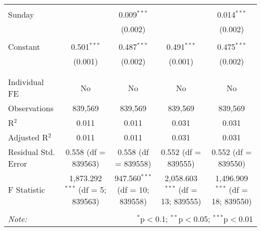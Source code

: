 \documentclass[
]{article}
\begin{document}
\begin{table}[!htbp]
{\begin{tabular}{@{\extracolsep{5pt}}lcccc}
  & & & & \\ 
 Sunday &  & 0.009$^{***}$ &  & 0.014$^{***}$ \\ 
  &  & (0.002) &  & (0.002) \\ 
  & & & & \\ 
 Constant & 0.501$^{***}$ & 0.487$^{***}$ & 0.491$^{***}$ & 0.475$^{***}$ \\ 
  & (0.001) & (0.002) & (0.001) & (0.002) \\ 
  & & & & \\ 
\hline \\[-1.8ex] 
Individual FE & No & No & No & No \\ 
Observations & 839,569 & 839,569 & 839,569 & 839,569 \\ 
R$^{2}$ & 0.011 & 0.011 & 0.031 & 0.031 \\ 
Adjusted R$^{2}$ & 0.011 & 0.011 & 0.031 & 0.031 \\ 
Residual Std. Error & 0.558 (df = 839563) & 0.558 (df = 839558) & 0.552 (df = 839555) & 0.552 (df = 839550) \\ 
F Statistic & 1,873.292$^{***}$ (df = 5; 839563) & 947.560$^{***}$ (df = 10; 839558) & 2,058.603$^{***}$ (df = 13; 839555) & 1,496.909$^{***}$ (df = 18; 839550) \\ 
\hline 
\hline \\[-1.8ex] 
\textit{Note:}  & \multicolumn{4}{r}{$^{*}$p$<$0.1; $^{**}$p$<$0.05; $^{***}$p$<$0.01} \\ 
\end{tabular}
} 
\end{table} 
\newpage
\end{document}
